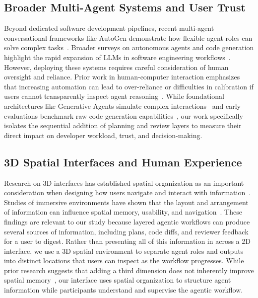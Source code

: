 \documentclass{chi-ext}
\begin{document}
\subsection{Broader Multi-Agent Systems and User Trust}
Beyond dedicated software development pipelines, recent multi-agent conversational frameworks like AutoGen demonstrate how flexible agent roles can solve complex tasks~\cite{wu2023autogen, xi2023rise}. Broader surveys on autonomous agents and code generation highlight the rapid expansion of LLMs in software engineering workflows~\cite{wang2023survey, hou2023large, zan2023large, jiang2023survey}. However, deploying these systems requires careful consideration of human oversight and reliance. Prior work in human-computer interaction emphasizes that increasing automation can lead to over-reliance or difficulties in calibration if users cannot transparently inspect agent reasoning~\cite{vaithilingam2022expectation, mozannar2022reading, bucinca2021trust}. While foundational architectures like Generative Agents simulate complex interactions~\cite{park2023generative} and early evaluations benchmark raw code generation capabilities~\cite{chen2021evaluating, bubeck2023sparks, zhang2023self}, our work specifically isolates the sequential addition of planning and review layers to measure their direct impact on developer workload, trust, and decision-making.

\subsection{3D Spatial Interfaces and Human Experience}
Research on 3D interfaces has established spatial organization as an important consideration when designing how users navigate and interact with information~\cite{bowman20043d}. Studies of immersive environments have shown that the layout and arrangement of information can influence spatial memory, usability, and navigation~\cite{liu2022effects, brett2025spatially}. These findings are relevant to our study because layered agentic workflows can produce several sources of information, including plans, code diffs, and reviewer feedback for a user to digest. Rather than presenting all of this information in across a 2D interface, we use a 3D spatial environment to separate agent roles and outputs into distinct locations that users can inspect as the workflow progresses. While prior research suggests that adding a third dimension does not inherently improve spatial memory~\cite{cockburn2004evaluating}, our interface uses spatial organization to structure agent information while participants understand and supervise the agentic workflow.
\end{document}
